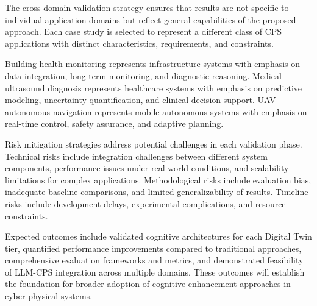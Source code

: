 The cross-domain validation strategy ensures that results are not specific to individual application domains but reflect general capabilities of the proposed approach. Each case study is selected to represent a different class of CPS applications with distinct characteristics, requirements, and constraints.

Building health monitoring represents infrastructure systems with emphasis on data integration, long-term monitoring, and diagnostic reasoning. Medical ultrasound diagnosis represents healthcare systems with emphasis on predictive modeling, uncertainty quantification, and clinical decision support. UAV autonomous navigation represents mobile autonomous systems with emphasis on real-time control, safety assurance, and adaptive planning.

Risk mitigation strategies address potential challenges in each validation phase. Technical risks include integration challenges between different system components, performance issues under real-world conditions, and scalability limitations for complex applications. Methodological risks include evaluation bias, inadequate baseline comparisons, and limited generalizability of results. Timeline risks include development delays, experimental complications, and resource constraints.

Expected outcomes include validated cognitive architectures for each Digital Twin tier, quantified performance improvements compared to traditional approaches, comprehensive evaluation frameworks and metrics, and demonstrated feasibility of LLM-CPS integration across multiple domains. These outcomes will establish the foundation for broader adoption of cognitive enhancement approaches in cyber-physical systems.

